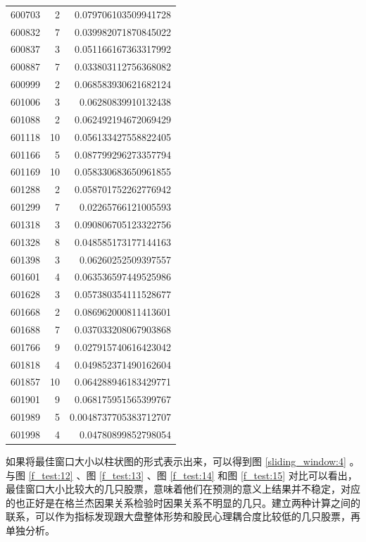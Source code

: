 \begin{center}
\begin{longtable}{rrr}
    600703 & 2 & 0.079706103509941728 \\
    600832 & 7 & 0.039982071870845022 \\
    600837 & 3 & 0.051166167363317992 \\
    600887 & 7 & 0.033803112756368082 \\
    600999 & 2 & 0.068583930621682124 \\
    601006 & 3 & 0.06280839910132438 \\
    601088 & 2 & 0.062492194672069429 \\
    601118 & 10 & 0.056133427558822405 \\
    601166 & 5 & 0.087799296273357794 \\
    601169 & 10 & 0.058330683650961855 \\
    601288 & 2 & 0.058701752262776942 \\
    601299 & 7 & 0.02265766121005593 \\
    601318 & 3 & 0.090806705123322756 \\
    601328 & 8 & 0.048585173177144163 \\
    601398 & 3 & 0.06260252509397557 \\
    601601 & 4 & 0.063536597449525986 \\
    601628 & 3 & 0.057380354111528677 \\
    601668 & 2 & 0.086962000811413601 \\
    601688 & 7 & 0.037033208067903868 \\
    601766 & 9 & 0.027915740616423042 \\
    601818 & 4 & 0.049852371490162604 \\
    601857 & 10 & 0.064288946183429771 \\
    601901 & 9 & 0.068175951565399767 \\
    601989 & 5 & 0.0048737705383712707 \\
    601998 & 4 & 0.04780899852798054 \\
    \bottomrule
  \end{longtable}
\end{center}

如果将最佳窗口大小以柱状图的形式表示出来，可以得到图 \ref{sliding_window:4} 。与图 \ref{f_test:12} 、图 \ref{f_test:13} 、图 \ref{f_test:14} 和图 \ref{f_test:15} 对比可以看出，最佳窗口大小比较大的几只股票，意味着他们在预测的意义上结果并不稳定，对应的也正好是在格兰杰因果关系检验时因果关系不明显的几只。建立两种计算之间的联系，可以作为指标发现跟大盘整体形势和股民心理耦合度比较低的几只股票，再单独分析。


